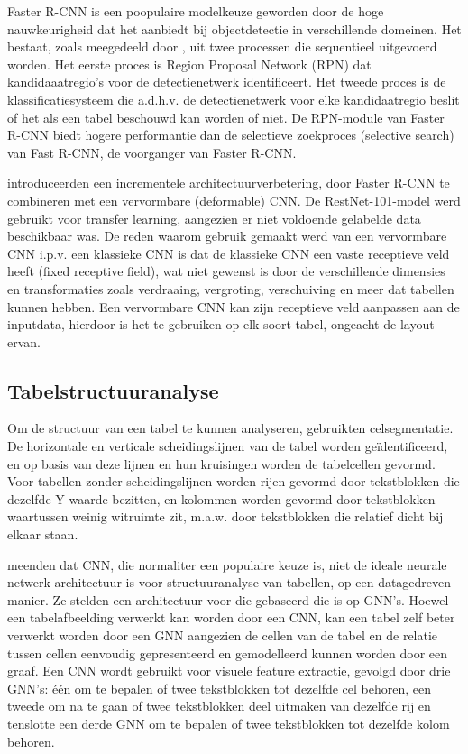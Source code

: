 Faster R-CNN is een poopulaire modelkeuze geworden door de hoge nauwkeurigheid dat het aanbiedt bij objectdetectie in verschillende domeinen. Het bestaat, zoals meegedeeld door \textcite{Shahzad2019}, uit twee processen die sequentieel uitgevoerd worden. Het eerste proces is Region Proposal Network (RPN) dat kandidaaatregio's voor de detectienetwerk identificeert. Het tweede proces is de klassificatiesysteem die a.d.h.v. de detectienetwerk voor elke kandidaatregio beslit of het als een tabel beschouwd kan worden of niet. De RPN-module van Faster R-CNN biedt hogere performantie dan de selectieve zoekproces (selective search) van Fast R-CNN, de voorganger van Faster R-CNN.

\textcite{Siddiqui2018} introduceerden een incrementele architectuurverbetering, door Faster R-CNN te combineren met een vervormbare (deformable) \Gls{CNN}. De RestNet-101-model werd gebruikt voor transfer learning, aangezien er niet voldoende gelabelde data beschikbaar was. De reden waarom gebruik gemaakt werd van een vervormbare \Gls{CNN} i.p.v. een klassieke \Gls{CNN} is dat de klassieke \Gls{CNN} een vaste receptieve veld heeft (fixed receptive field), wat niet gewenst is door de verschillende dimensies en transformaties zoals verdraaing, vergroting, verschuiving en meer dat tabellen kunnen hebben. Een vervormbare \Gls{CNN} kan zijn receptieve veld aanpassen aan de inputdata, hierdoor is het te gebruiken op elk soort tabel, ongeacht de layout ervan.

\subsection{Tabelstructuuranalyse}
\label{subsec:tabel-structuur-analyse}

Om de structuur van een tabel te kunnen analyseren, gebruikten \textcite{Nazemi2016} celsegmentatie. De horizontale en verticale scheidingslijnen van de tabel worden geïdentificeerd, en op basis van deze lijnen en hun kruisingen worden de tabelcellen gevormd. Voor tabellen zonder scheidingslijnen worden rijen gevormd door tekstblokken die dezelfde Y-waarde bezitten, en kolommen worden gevormd door tekstblokken waartussen weinig witruimte zit, m.a.w. door tekstblokken die relatief dicht bij elkaar staan.

\textcite{Qasim2019} meenden dat \Gls{CNN}, die normaliter een populaire keuze is, niet de ideale neurale netwerk architectuur is voor structuuranalyse van tabellen, op een datagedreven manier. Ze stelden een architectuur voor die gebaseerd die is op \Gls{GNN}'s. Hoewel een tabelafbeelding verwerkt kan worden door een \Gls{CNN}, kan een tabel zelf beter verwerkt worden door een \Gls{GNN} aangezien de cellen van de tabel en de relatie tussen cellen eenvoudig gepresenteerd en gemodelleerd kunnen worden door een graaf. Een \Gls{CNN} wordt gebruikt voor visuele feature extractie, gevolgd door drie \Gls{GNN}'s: één om te bepalen of twee tekstblokken tot dezelfde cel behoren, een tweede om na te gaan of twee tekstblokken deel uitmaken van dezelfde rij en tenslotte een derde \Gls{GNN} om te bepalen of twee tekstblokken tot dezelfde kolom behoren.


